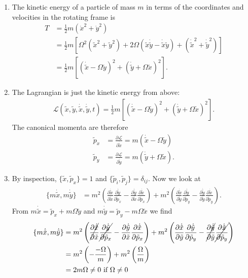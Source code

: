 \documentclass{article}
\theoremstyle{definition}
\newcommand{\p}{\partial}
\newcommand{\lag}{\mathcal{L}}
\newcommand{\f}[2]{\frac{#1}{#2}}
\newcommand{\lp}{\left(}
\newcommand{\rp}{\right)}
\newcommand{\lb}{\left[}
\newcommand{\rb}{\right]}
\begin{document}
\begin{enumerate}[label=\alph*)]
	\item The kinetic energy of a particle of mass $m$ in terms of the coordinates and velocities in the rotating frame is 
	\begin{align*}
		T 
		&= \f{1}{2} m (\dot{x}^2 + \dot{y}^2)\\ 
		&= \f{1}{2}m \lb \Omega^2 (\tilde{x}^2 + \tilde{y}^2) + 2\Omega (\tilde{x}\dot{\tilde{y}} - \dot{\tilde{x}}\tilde{y}) + (\dot{\tilde{x}}^2 + \dot{\tilde{y}}^2)  \rb \\
		&= {\f{1}{2}m \lb  ( \dot{\tilde{x}} - \Omega \tilde{y})^2 + (\dot{\tilde{y}} + \Omega \tilde{x} )^2 \rb}.
	\end{align*}
	
	\item The Lagrangian is just the kinetic energy from above:
	\begin{align*}
		\lag(\tilde{x}, \tilde{y}, \dot{\tilde{x}}, \dot{\tilde{y}}, t) =  {\f{1}{2}m \lb  ( \dot{\tilde{x}} - \Omega \tilde{y})^2 + (\dot{\tilde{y}} + \Omega \tilde{x} )^2 \rb}.
	\end{align*}
	The canonical momenta are therefore
	\begin{align*}
		\tilde{p}_x &= \f{\p \lag}{\p \dot{\tilde{x}}} = m(\dot{\tilde{x}} - \Omega \tilde{y}) \\
		\tilde{p}_y &= \f{\p \lag}{\p \dot{\tilde{y}}} = m(\dot{\tilde{y}} + \Omega \tilde{x}).
	\end{align*}
	
	\item By inspection, $\{\tilde{x}, \tilde{p}_x\} = 1$ and $\{ \tilde{p}_i, \tilde{p}_j \} = \delta_{ij}$. Now we look at  
	\begin{align*}
		\{ m\dot{\tilde{x}}, m\dot{\tilde{y}} \} &= m^2\lp \f{\p \dot{\tilde{x}} }{\p \tilde{x}}
		{\f{\p \dot{\tilde{y}} }{\p \tilde{p}_x}} - \f{\p \dot{\tilde{y}}}{\p \tilde{x}}\f{\p \dot{\tilde{x}}}{\p \tilde{p}_x}\rp + 
		m^2\lp \f{\p \dot{\tilde{x}} }{\p \tilde{y}}\f{\p \dot{\tilde{y}} }{\p \tilde{p}_y} - \f{\p \dot{\tilde{y}}}{\p \tilde{y}} {\f{\p \dot{\tilde{x}}}{\p \tilde{p}_y}}\rp.
	\end{align*}
	From $m\dot{\tilde{x}} = \tilde{p}_x + m\Omega \tilde{y}$ and $m\dot{\tilde{y}} = \tilde{p}_y - m\Omega \tilde{x}$ we find 
	\begin{align*}
		\{ m\dot{\tilde{x}}, m\dot{\tilde{y}} \} 
		&= m^2\lp \cancel{\f{\p \dot{\tilde{x}} }{\p \tilde{x}}}
		\cancel{\f{\p \dot{\tilde{y}} }{\p \tilde{p}_x}} - \f{\p \dot{\tilde{y}}}{\p \tilde{x}}\f{\p \dot{\tilde{x}}}{\p \tilde{p}_x}\rp + 
		m^2\lp \f{\p \dot{\tilde{x}} }{\p \tilde{y}}\f{\p \dot{\tilde{y}} }{\p \tilde{p}_y} -\cancel{ \f{\p \dot{\tilde{y}}}{\p \tilde{y}}} \cancel{\f{\p \dot{\tilde{x}}}{\p \tilde{p}_y}}\rp\\
		&= m^2\lp-\f{-\Omega}{m}\rp + m^2\lp \f{\Omega}{m} \rp \\
		&= {2m\Omega \neq 0 \text{ if } \Omega \neq 0}
	\end{align*}
	

\end{enumerate}
\end{document}
